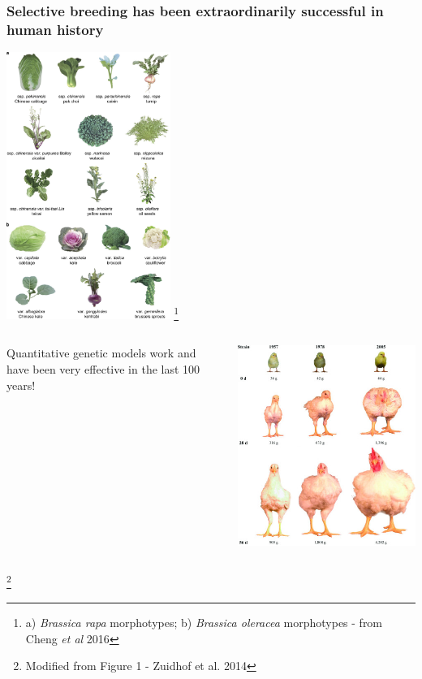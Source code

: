 \documentclass[xcolor=dvipsnames]{beamer}
\newcommand\blfootnote[1]{%
	\begingroup
	\renewcommand\thefootnote{}\footnote{#1}%
	\addtocounter{footnote}{-1}%
	\endgroup
}
\begin{document}
\begin{frame}
\frametitle{	Selective breeding has been extraordinarily successful in human history}
	\centering 	\includegraphics[keepaspectratio, width  = 0.4\textwidth]{img/brassica}
\blfootnote{a) \textit{Brassica rapa} morphotypes; b) \textit{Brassica oleracea} morphotypes - from Cheng \textit{et al }2016}
\end{frame}

\begin{frame}
\begin{columns}
	\begin{column}{0.3\textwidth}	
		Quantitative genetic models work and have been very effective in the last 100 years!
	\end{column}
	\begin{column}{0.7\textwidth}
		\centering
		\includegraphics[keepaspectratio, width  =\textwidth]{img/zuidhof_2014} 
	\end{column}
\end{columns}
\blfootnote {Modified from Figure 1 - Zuidhof et al. 2014}
\end{frame}
\end{document}
